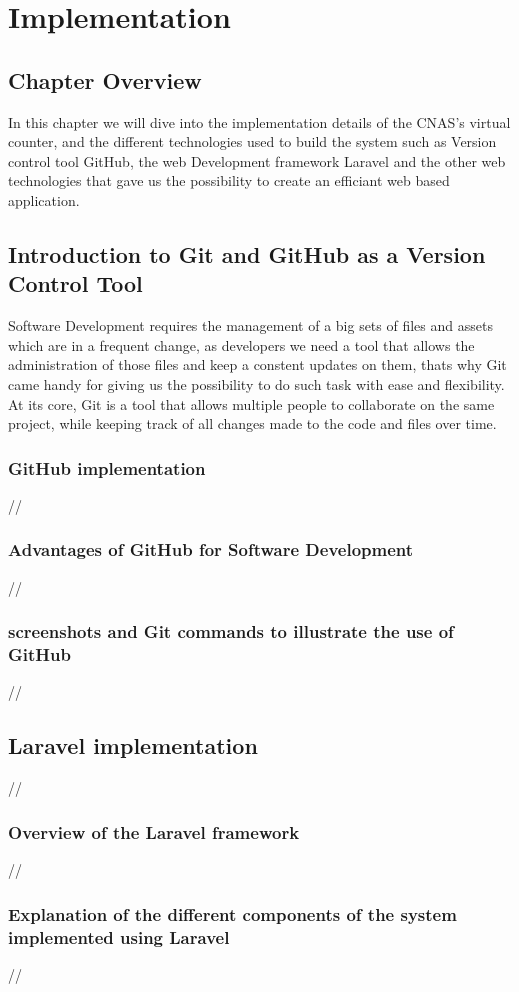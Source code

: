 \chapter
{Implementation}
\section{Chapter Overview}
In this chapter we will dive into the implementation details of the CNAS's virtual counter, and the different technologies used to build the system such as Version control tool GitHub, the web Development framework Laravel and the other web technologies that gave us the possibility to create an efficiant web based application. 
\section{Introduction to Git and GitHub as a Version Control Tool}
Software Development requires the management of a big sets of files and assets which are in a frequent change, as developers we need a tool that allows the administration of those files and keep a constent updates on them, thats why Git came handy for giving us the possibility to do such task with ease and flexibility. At its core, Git is a tool that allows multiple people to collaborate on the same project, while keeping track of all changes made to the code and files over time. 
\subsection{GitHub implementation}
//
\subsection{Advantages of GitHub for Software Development}
//
\subsection{screenshots and Git commands to illustrate the use of GitHub}
//
\section {Laravel implementation}
//
\subsection {Overview of the Laravel framework}
//
\subsection {Explanation of the different components of the system implemented using Laravel}
//
